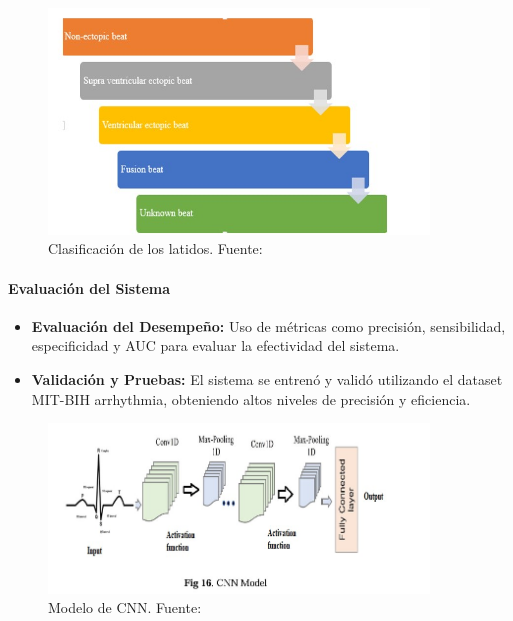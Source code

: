 \begin{figure}[H]
    \centering
    \includegraphics[width=0.9\textwidth]{images_repo/clasilatid.jpg}
    \caption{Clasificación de los latidos. Fuente: \cite{arulkumar2023monitoring}}
    \label{Clasificación de los latidos}
\end{figure}

\paragraph{Evaluación del Sistema}

\begin{itemize}
    \item \textbf{Evaluación del Desempeño:} Uso de métricas como precisión, sensibilidad, especificidad y AUC para evaluar la efectividad del sistema.
    \item \textbf{Validación y Pruebas:} El sistema se entrenó y validó utilizando el dataset MIT-BIH arrhythmia, obteniendo altos niveles de precisión y eficiencia.
\end{itemize}

\begin{figure}[H]
    \centering
    \includegraphics[width=0.9\textwidth]{images_repo/CNN.jpg}
    \caption{Modelo de CNN. Fuente: \cite{arulkumar2023monitoring}}
    \label{Modelo de CNN}
\end{figure}

